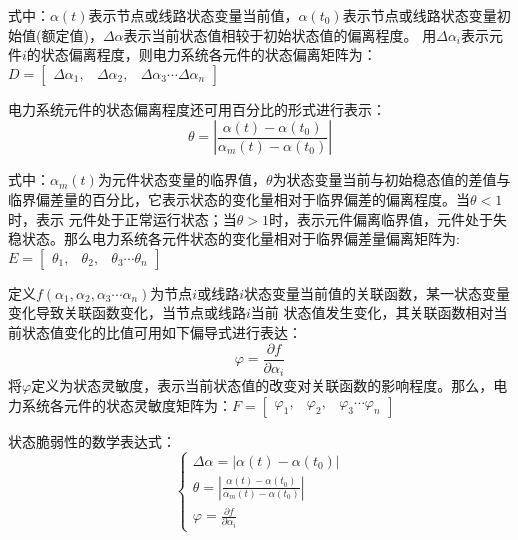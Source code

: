 式中：$\alpha(t)$表示节点或线路状态变量当前值，$\alpha\left(t_{0}\right)$表示节点或线路状态变量初始值(额定值)，$\Delta \alpha$表示当前状态值相较于初始状态值的偏离程度。
用$\Delta \alpha_i$表示元件$i$的状态偏离程度，则电力系统各元件的状态偏离矩阵为：$D=\left[\begin{array}{lll}{\Delta \alpha_{1},} & {\Delta \alpha_{2},} & {\Delta \alpha_{3} \cdots \Delta \alpha_{n}}\end{array}\right]$


电力系统元件的状态偏离程度还可用百分比的形式进行表示：
\begin{equation}
  \theta=\left|\frac{\alpha(t)-\alpha\left(t_{0}\right)}{\alpha_{m}(t)-\alpha\left(t_{0}\right)}\right|
  \end{equation}

式中：$\alpha_{m}(t)$为元件状态变量的临界值，$\theta$为状态变量当前与初始稳态值的差值与临界偏差量的百分比，它表示状态的变化量相对于临界偏差的偏离程度。当$\theta<1$时，表示
元件处于正常运行状态；当$\theta>1$时，表示元件偏离临界值，元件处于失稳状态。那么电力系统各元件状态的变化量相对于临界偏差量偏离矩阵为:$E=\left[\begin{array}{lll}{\theta_{1},} & {\theta_{2},} & {\theta_{3} \cdots \theta_{n}}\end{array}\right]$

定义$f\left(\alpha_{1}, \alpha_{2}, \alpha_{3} \cdots \alpha_{n}\right)$为节点$i$或线路$i$状态变量当前值的关联函数，某一状态变量变化导致关联函数变化，当节点或线路$i$当前
状态值发生变化，其关联函数相对当前状态值变化的比值可用如下偏导式进行表达：
\begin{equation}
  \varphi=\frac{\partial f}{\partial \alpha_{i}}
  \end{equation}
将$\varphi$定义为状态灵敏度，表示当前状态值的改变对关联函数的影响程度。那么，电力系统各元件的状态灵敏度矩阵为：$F=\left[\begin{array}{lll}{\varphi_{1},} & {\varphi_{2},} & {\varphi_{3} \cdots \varphi_{n}}\end{array}\right]$

状态脆弱性的数学表达式：
  \begin{equation}
  \left\{\begin{array}{l}{\Delta \alpha=\left|\alpha(t)-\alpha\left(t_{0}\right)\right|} \\
   {\theta=\left|\frac{\alpha(t)-\alpha\left(t_{0}\right)}{\alpha_{m}(t)-\alpha\left(t_{0}\right)}\right|} \\
   {\varphi=\frac{\partial f}{\partial \alpha_{i}}}\end{array}\right.
  \end{equation}
  
